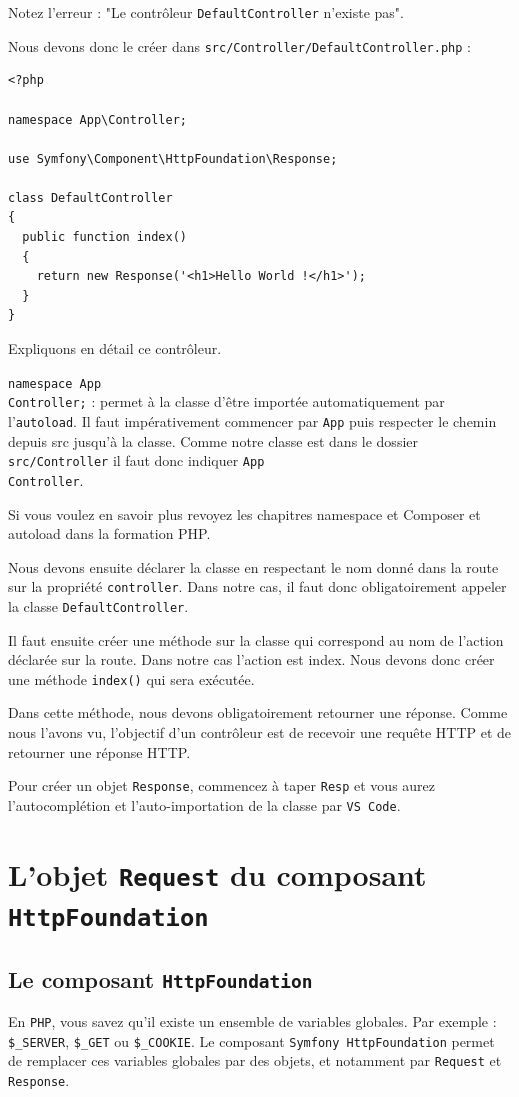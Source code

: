 \documentclass{article}
\begin{document}
Notez l'erreur : "Le contrôleur {\tt DefaultController} n'existe pas".

Nous devons donc le créer dans {\tt src/Controller/DefaultController.php} :

\begin{verbatim}
<?php

namespace App\Controller;

use Symfony\Component\HttpFoundation\Response;

class DefaultController
{
  public function index()
  {
    return new Response('<h1>Hello World !</h1>');
  }
}
\end{verbatim}

Expliquons en détail ce contrôleur.

{\tt namespace App\\Controller;} : permet à la classe d'être importée automatiquement par l'{\tt autoload}. Il faut impérativement commencer par {\tt App} puis respecter le chemin depuis src jusqu'à la classe. Comme notre classe est dans le dossier {\tt src/Controller} il faut donc indiquer {\tt App\\Controller}.

Si vous voulez en savoir plus revoyez les chapitres namespace et Composer et autoload dans la formation PHP.

Nous devons ensuite déclarer la classe en respectant le nom donné dans la route sur la propriété {\tt controller}. Dans notre cas, il faut donc obligatoirement appeler la classe {\tt DefaultController}.

Il faut ensuite créer une méthode sur la classe qui correspond au nom de l'action déclarée sur la route. Dans notre cas l'action est index. Nous devons donc créer une méthode {\tt index()} qui sera exécutée.

Dans cette méthode, nous devons obligatoirement retourner une réponse. Comme nous l'avons vu, l'objectif d'un contrôleur est de recevoir une requête HTTP et de retourner une réponse HTTP.

Pour créer un objet {\tt Response}, commencez à taper {\tt Resp} et vous aurez l'autocomplétion et l'auto-importation de la classe par {\tt VS Code}.


\section{L'objet {\tt Request} du composant {\tt HttpFoundation}}
\subsection{Le composant {\tt HttpFoundation}}
En {\tt PHP}, vous savez qu'il existe un ensemble de variables globales. Par exemple : {\tt \$\_SERVER}, {\tt \$\_GET} ou {\tt \$\_COOKIE}. Le composant {\tt Symfony HttpFoundation} permet de remplacer ces variables globales par des objets, et notamment par {\tt Request} et {\tt Response}.
\end{document}
